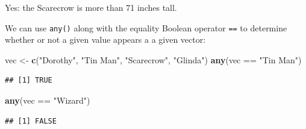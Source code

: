 \documentclass[]{book}
\makeatletter
\newenvironment{Shaded}{\begin{snugshade}}{\end{snugshade}}
\newcommand{\KeywordTok}[1]{\textcolor[rgb]{0.13,0.29,0.53}{\textbf{{#1}}}}
\newcommand{\StringTok}[1]{\textcolor[rgb]{0.31,0.60,0.02}{{#1}}}
\newcommand{\NormalTok}[1]{{#1}}
\newenvironment{kframe}{%
\medskip{}
\setlength{\fboxsep}{.8em}
 \def\at@end@of@kframe{}%
 \ifinner\ifhmode%
  \def\at@end@of@kframe{\end{minipage}}%
  \begin{minipage}{\columnwidth}%
 \fi\fi%
 \def\FrameCommand##1{\hskip\@totalleftmargin \hskip-\fboxsep
 \colorbox{shadecolor}{##1}\hskip-\fboxsep
     \hskip-\linewidth \hskip-\@totalleftmargin \hskip\columnwidth}%
 \MakeFramed {\advance\hsize-\width
   \@totalleftmargin\z@ \linewidth\hsize
   \@setminipage}}%
 {\par\unskip\endMakeFramed%
 \at@end@of@kframe}
\renewenvironment{Shaded}{\begin{kframe}}{\end{kframe}}
\theoremstyle{definition}
\theoremstyle{definition}
\theoremstyle{remark}
\makeatother
\begin{document}
Yes: the Scarecrow is more than 71 inches tall.

We can use \texttt{any()} along with the equality Boolean operator
\texttt{==} to determine whether or not a given value appears a a given
vector:

\begin{Shaded}
\begin{Highlighting}[]
\NormalTok{vec <-}\StringTok{ }\KeywordTok{c}\NormalTok{(}\StringTok{"Dorothy"}\NormalTok{, }\StringTok{"Tin Man"}\NormalTok{, }\StringTok{"Scarecrow"}\NormalTok{, }\StringTok{"Glinda"}\NormalTok{)}
\KeywordTok{any}\NormalTok{(vec ==}\StringTok{ "Tin Man"}\NormalTok{)}
\end{Highlighting}
\end{Shaded}

\begin{verbatim}
## [1] TRUE
\end{verbatim}

\begin{Shaded}
\begin{Highlighting}[]
\KeywordTok{any}\NormalTok{(vec ==}\StringTok{ "Wizard"}\NormalTok{)}
\end{Highlighting}
\end{Shaded}

\begin{verbatim}
## [1] FALSE
\end{verbatim}
\end{document}

